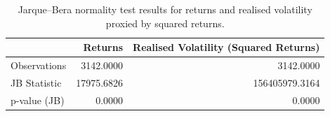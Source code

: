 \begin{table}
\caption{Jarque–Bera normality test results for returns and realised volatility proxied by squared returns.}
\label{tab:jarque_bera}
\begin{tabular}{lrr}
\toprule
 & Returns & Realised Volatility (Squared Returns) \\
\midrule
Observations & 3142.0000 & 3142.0000 \\
JB Statistic & 17975.6826 & 156405979.3164 \\
p-value (JB) & 0.0000 & 0.0000 \\
\bottomrule
\end{tabular}
\end{table}
